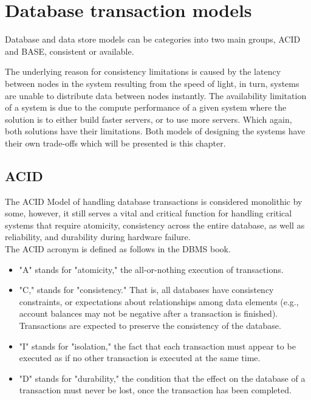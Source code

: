 \documentclass[a4paper,10pt,titlepage]{report}
\begin{document}
\chapter{Database transaction models}

Database and data store models can be categories into two main groups, ACID and BASE,  consistent or available. 

The underlying reason for consistency limitations is caused by the latency between nodes in the system resulting from the speed of light, in turn, systems are unable to distribute data between nodes instantly. The availability limitation of a system is due to the compute performance of a given system where the solution is to either build faster servers, or to use more servers. Which again, both solutions have their limitations. Both models of designing the systems have their own trade-offs which will be presented is this chapter.



\section{ACID}
The ACID Model of handling database transactions is considered monolithic by some, however, it still serves a vital and critical function for handling critical systems that require atomicity, consistency across the entire database, as well as reliability, and durability during hardware failure.\\
\vspace{5mm}
The ACID acronym is defined as follows in the DBMS book\cite{DBMSbook}.

\begin{itemize}
    \item "A" stands for "atomicity," the all-or-nothing execution of transactions.
    \item "C," stands for "consistency." That is, all databases
have consistency constraints, or expectations about relationships among
data elements (e.g., account balances may not be negative after a transaction is finished). Transactions are expected to preserve the consistency of
the database.
\item "I" stands for "isolation," the fact that each transaction must appear
to be executed as if no other transaction is executed at the same
time.
\item "D" stands for "durability," the condition that the effect on the
database of a transaction must never be lost, once the transaction
has been completed.
\end{itemize}
\end{document}
